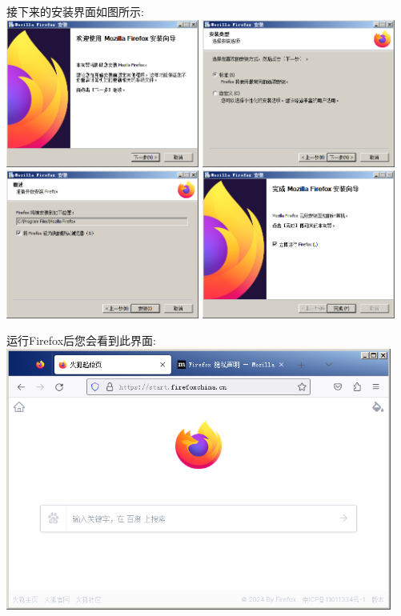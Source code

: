 \newpage

接下来的安装界面如图所示: \\
\includegraphics[width=2.5in]{media/image5.png}
\includegraphics[width=2.5in]{media/image6.png} \\
\includegraphics[width=2.5in]{media/image7.png}
\includegraphics[width=2.5in]{media/image8.png}

运行Firefox后您会看到此界面: \\
\includegraphics[width=5in]{media/image9.png}

